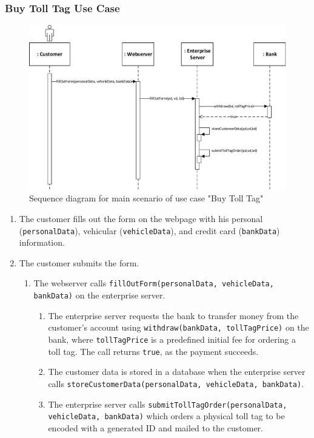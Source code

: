 \subsubsection{Buy Toll Tag Use Case}

\begin{figure}
\centerline{\includegraphics[width=\textwidth]{"img/sequence_diagrams/sequence_diagram_buy_toll_tag"}}
\caption{Sequence diagram for main scenario of use case "Buy Toll Tag"}
\label{fig:seq_buy_toll_tag}
\end{figure}

\begin{enumerate}
\item The customer fills out the form on the webpage with his personal (\texttt{personalData}), vehicular (\texttt{vehicleData}), and credit card (\texttt{bankData}) information.
\item The customer submits the form.
	\begin{enumerate}
	\item The webserver calls \texttt{fillOutForm(personalData, vehicleData, bankData)} on the enterprise server.
		\begin{enumerate}
		\item The enterprise server requests the bank to transfer money from the customer's account using \texttt{withdraw(bankData, tollTagPrice)} on the bank, where \texttt{tollTagPrice} is a predefined initial fee for ordering a toll tag. The call returns \texttt{true}, as the payment succeeds.
		\item The customer data is stored in a database when the enterprise server calls \texttt{storeCustomerData(personalData, vehicleData, bankData)}.
		\item The enterprise server calls \texttt{submitTollTagOrder(personalData, vehicleData, bankData)} which orders a physical toll tag to be encoded with a generated ID and mailed to the customer.
		\end{enumerate}
	\end{enumerate}
\end{enumerate}